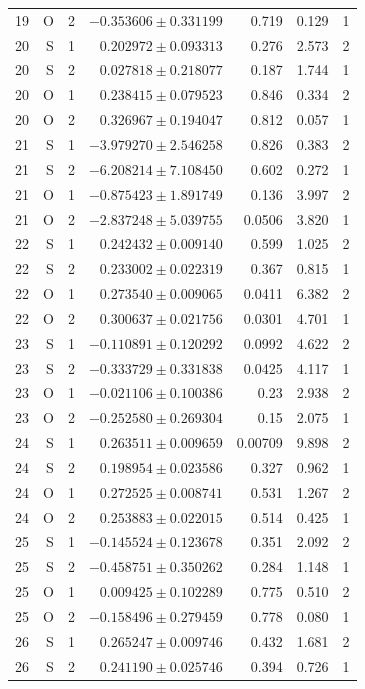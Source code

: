 {\begin{longtable}{lrrrrrr}
19 & O & 2 & $-0.353606\pm0.331199$ & 0.719 & 0.129 & 1\\
20 & S & 1 & $0.202972\pm0.093313$ & 0.276 & 2.573 & 2\\
20 & S & 2 & $0.027818\pm0.218077$ & 0.187 & 1.744 & 1\\
20 & O & 1 & $0.238415\pm0.079523$ & 0.846 & 0.334 & 2\\
20 & O & 2 & $0.326967\pm0.194047$ & 0.812 & 0.057 & 1\\
21 & S & 1 & $-3.979270\pm2.546258$ & 0.826 & 0.383 & 2\\
21 & S & 2 & $-6.208214\pm7.108450$ & 0.602 & 0.272 & 1\\
21 & O & 1 & $-0.875423\pm1.891749$ & 0.136 & 3.997 & 2\\
21 & O & 2 & $-2.837248\pm5.039755$ & 0.0506 & 3.820 & 1\\
22 & S & 1 & $0.242432\pm0.009140$ & 0.599 & 1.025 & 2\\
22 & S & 2 & $0.233002\pm0.022319$ & 0.367 & 0.815 & 1\\
22 & O & 1 & $0.273540\pm0.009065$ & 0.0411 & 6.382 & 2\\
22 & O & 2 & $0.300637\pm0.021756$ & 0.0301 & 4.701 & 1\\
23 & S & 1 & $-0.110891\pm0.120292$ & 0.0992 & 4.622 & 2\\
23 & S & 2 & $-0.333729\pm0.331838$ & 0.0425 & 4.117 & 1\\
23 & O & 1 & $-0.021106\pm0.100386$ & 0.23 & 2.938 & 2\\
23 & O & 2 & $-0.252580\pm0.269304$ & 0.15 & 2.075 & 1\\
24 & S & 1 & $0.263511\pm0.009659$ & 0.00709 & 9.898 & 2\\
24 & S & 2 & $0.198954\pm0.023586$ & 0.327 & 0.962 & 1\\
24 & O & 1 & $0.272525\pm0.008741$ & 0.531 & 1.267 & 2\\
24 & O & 2 & $0.253883\pm0.022015$ & 0.514 & 0.425 & 1\\
25 & S & 1 & $-0.145524\pm0.123678$ & 0.351 & 2.092 & 2\\
25 & S & 2 & $-0.458751\pm0.350262$ & 0.284 & 1.148 & 1\\
25 & O & 1 & $0.009425\pm0.102289$ & 0.775 & 0.510 & 2\\
25 & O & 2 & $-0.158496\pm0.279459$ & 0.778 & 0.080 & 1\\
26 & S & 1 & $0.265247\pm0.009746$ & 0.432 & 1.681 & 2\\
26 & S & 2 & $0.241190\pm0.025746$ & 0.394 & 0.726 & 1\\

\end{longtable}}
